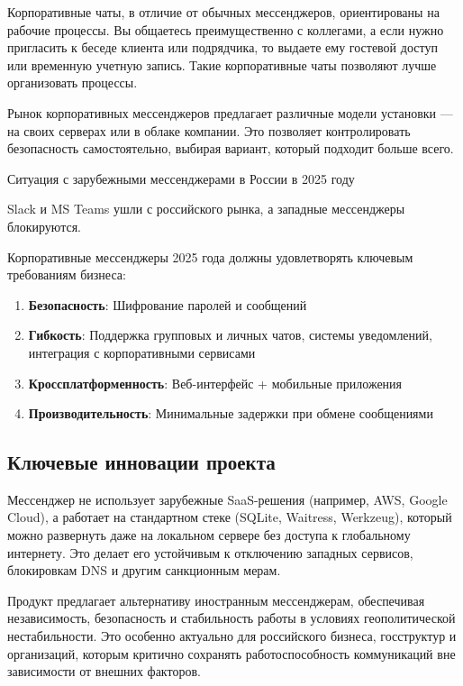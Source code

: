 Корпоративные чаты, в отличие от обычных мессенджеров, ориентированы на рабочие процессы. Вы общаетесь преимущественно с коллегами, а если нужно пригласить к беседе клиента или подрядчика, то выдаете ему гостевой доступ или временную учетную запись. Такие корпоративные чаты позволяют лучше организовать процессы.

Рынок корпоративных мессенджеров предлагает различные модели установки — на своих серверах или в облаке компании. Это позволяет контролировать безопасность самостоятельно, выбирая вариант, который подходит больше всего.

Ситуация с зарубежными мессенджерами в России в 2025 году

Slack и MS Teams ушли с российского рынка, а западные мессенджеры блокируются.

Корпоративные мессенджеры 2025 года должны удовлетворять ключевым требованиям бизнеса:

\begin{enumerate}
	\item \textbf{Безопасность}: Шифрование паролей и сообщений
	\item \textbf{Гибкость}: Поддержка групповых и личных чатов, системы уведомлений, интеграция с корпоративными сервисами
	\item \textbf{Кроссплатформенность}: Веб-интерфейс + мобильные приложения
	\item \textbf{Производительность}: Минимальные задержки при обмене сообщениями
\end{enumerate}

\subsection{Ключевые инновации проекта}

Мессенджер не использует зарубежные SaaS-решения (например, AWS, Google Cloud), а работает на стандартном стеке (SQLite, Waitress, Werkzeug), который можно развернуть даже на локальном сервере без доступа к глобальному интернету. Это делает его устойчивым к отключению западных сервисов, блокировкам DNS и другим санкционным мерам.

Продукт предлагает альтернативу иностранным мессенджерам, обеспечивая независимость, безопасность и стабильность работы в условиях геополитической нестабильности. Это особенно актуально для российского бизнеса, госструктур и организаций, которым критично сохранять работоспособность коммуникаций вне зависимости от внешних факторов.
		

